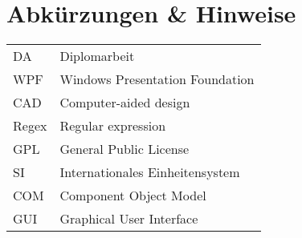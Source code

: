 \section*{Abkürzungen \& Hinweise}
\begin{singlespace}	
	\begin{tabular}{ll}
		DA     & Diplomarbeit \\
		WPF    & Windows Presentation Foundation \\
		CAD    & Computer-aided design \\
		Regex  & Regular expression \\
		GPL    & General Public License  \\
		SI     & Internationales Einheitensystem \\
		COM    & Component Object Model \\
		GUI    & Graphical User Interface \\
	\end{tabular}
\end{singlespace}

\pagebreak
